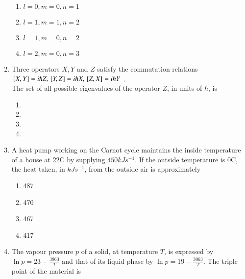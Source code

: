 \documentclass[journal]{IEEEtran}
\begin{document}
\begin{enumerate}
\begin{multicols}{2}
    \begin{enumerate}
        \item $l=0,m=0,n=1$
        \item $l=1,m=1,n=2$
        \item $l=1,m=0,n=2$
        \item $l=2,m=0,n=3$
    \end{enumerate}
\end{multicols}
\item  Three operators $X,Y$ and $Z$ satisfy the commutation relations\\ ${}\left[X,Y\right]=i\hbar Z,{}\left[Y, Z\right]=i\hbar X,{}\left[Z, X\right]=i\hbar Y$ .\\The set of all possible eigenvalues of the operator $Z$, in units of $\hbar$, is
\begin{multicols}{2}
    \begin{enumerate}
        \item {}
        \item {}
        \item {}
        \item {}
    \end{enumerate}
\end{multicols}
\item A heat pump working on the Carnot cycle maintains the inside temperature of a house at 22\degree C by supplying $450 kJ s^{-1}$. If the outside temperature is 0\degree C, the heat taken, in $kJ s^{-1}$, from the outside air is approximately
\begin{multicols}{4}
    \begin{enumerate}
        \item 487
        \item 470
        \item 467
        \item 417
    \end{enumerate}
\end{multicols}
\item The vapour pressure $p$  of a solid, at temperature $T$, is expressed by $\ln p = 23-\frac{3863}{T}$ and that of its liquid phase by $\ln p = 19-\frac{3063}{T}$. The triple point of the material is
\begin{multicols}{4}
    \begin{enumerate}

\end{enumerate}
\end{multicols}
\end{enumerate}
\end{document}
